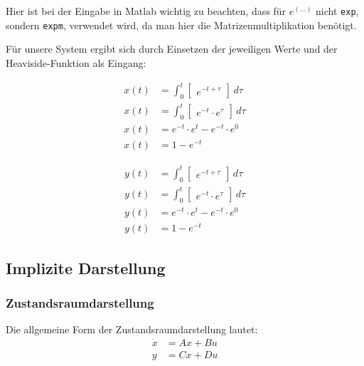 Hier ist bei der Eingabe in Matlab wichtig zu beachten, dass für $e^{(\ldots)}$ nicht \texttt{exp}, sondern \texttt{expm}, verwendet wird, da man hier die Matrizenmultiplikation benötigt.

Für unsere System ergibt sich durch Einsetzen der jeweiligen Werte und der Heaviside-Funktion als Eingang:

\noindent
\begin{minipage}{.5\linewidth}   
    \begin{align*}
        x(t) & = \int_{0}^{t} \begin{bmatrix}e^{-t + \tau}\end{bmatrix} \,d\tau \\
        x(t) & = \int_{0}^{t} \begin{bmatrix}e^{-t} \cdot e^{\tau}\end{bmatrix} \,d\tau \\
        x(t) & = e^{-t} \cdot e^{t} - e^{-t} \cdot e^{0} \\
        x(t) & = 1 - e^{-t}
    \end{align*}
\end{minipage}
\begin{minipage}{.5\linewidth}   
    \begin{align*}
        y(t) & = \int_{0}^{t} \begin{bmatrix}e^{-t + \tau}\end{bmatrix} \,d\tau \\
        y(t) & = \int_{0}^{t} \begin{bmatrix}e^{-t} \cdot e^{\tau}\end{bmatrix} \,d\tau \\
        y(t) & = e^{-t} \cdot e^{t} - e^{-t} \cdot e^{0} \\
        y(t) & = 1 - e^{-t}
    \end{align*}
\end{minipage}

\subsection{Implizite Darstellung}
\subsubsection{Zustandsraumdarstellung}
Die allgemeine Form der Zustandsraumdarstellung lautet:
\begin{align*}
    \dot x & = Ax + Bu \nonumber \\
    y & = Cx + Du
\end{align*}

